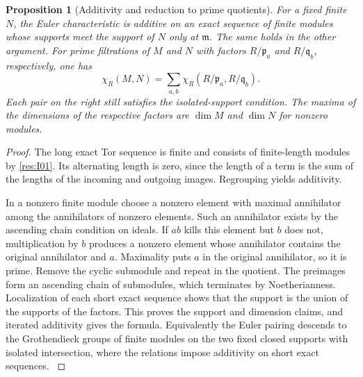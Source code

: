\documentclass[11pt,oneside,openany]{book}
\newtheorem{proposition}[theorem]{Proposition}
\theoremstyle{definition}
\theoremstyle{remark}
\begin{document}
\begin{proposition}[Additivity and reduction to prime quotients]\label{res:I02}
For a fixed finite \(N\), the Euler characteristic is additive on an
exact sequence of finite modules whose supports meet the support of
\(N\) only at \(\mathfrak m\). The same holds in the other argument.
For prime filtrations of \(M\) and \(N\) with factors
\(R/\mathfrak p_a\) and \(R/\mathfrak q_b\), respectively, one has
\[
 \chi_R(M,N)=
 \sum_{a,b}\chi_R(R/\mathfrak p_a,R/\mathfrak q_b).
\]
Each pair on the right still satisfies the isolated-support condition.
The maxima of the dimensions of the respective factors are
\(\dim M\) and \(\dim N\) for nonzero modules.
\end{proposition}
\begin{proof}
The long exact Tor sequence is finite and consists of finite-length
modules by \ref{res:I01}. Its alternating length is zero, since the
length of a term is the sum of the lengths of the incoming and outgoing
images. Regrouping yields additivity.

In a nonzero finite module choose a nonzero element with maximal
annihilator among the annihilators of nonzero elements. Such an
annihilator exists by the ascending chain condition on ideals. If
\(ab\) kills this element but \(b\) does not, multiplication by \(b\)
produces a nonzero element whose annihilator contains the original
annihilator and \(a\). Maximality puts \(a\) in the original
annihilator, so it is prime. Remove the cyclic submodule and repeat
in the quotient. The preimages form an ascending chain of submodules,
which terminates by Noetherianness. Localization of each short exact
sequence shows that the support is the union of the supports of the
factors. This proves the support and dimension claims, and iterated
additivity gives the formula. Equivalently the Euler pairing descends
to the Grothendieck groups of finite modules on the two fixed closed
supports with isolated intersection, where the relations impose
additivity on short exact sequences. \cite[\S2, Lemma 2.2]{dugger}
\end{proof}
\end{document}
